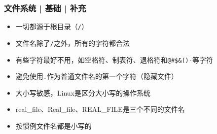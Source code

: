 \begin{frame}[fragile]
  \frametitle{文件系统 | 基础 | \alert{补充}}
  \begin{itemize}[<+->]
    \item 一切都源于根目录（\verb|/|）
    \item 文件名除了\verb|/|之外，所有的字符都合法
    \item 有些字符最好不用，如空格符、制表符、退格符和\verb|@#$&()-|等字符
    \item 避免使用\verb|.|作为普通文件名的第一个字符（隐藏文件）
    \item 大小写敏感，Linux是区分大小写的操作系统
    \item real\_file、Real\_file、REAL\_FILE是三个不同的文件名
    \item 按惯例文件名都是小写的
  \end{itemize}
\end{frame}

